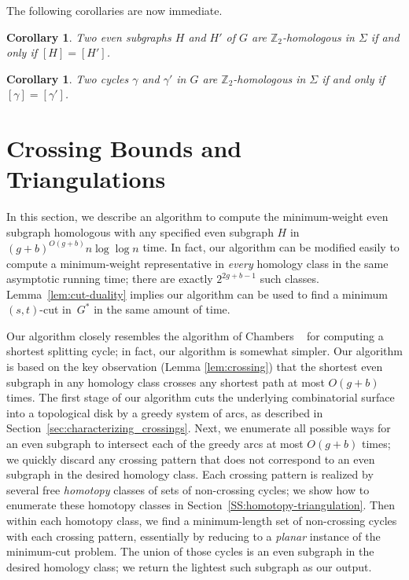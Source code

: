 \documentclass[11pt,twoside]{article}
\def\Z{\mathbb{Z}}
\def\cycle{\gamma}
\newtheorem{corollary}[theorem]{Corollary}
\begin{document}
The following corollaries are now immediate.

\begin{corollary}
Two even subgraphs $H$ and $H'$ of $G$ are $\Z_2$-homologous in $\Sigma$ if and only if $[H] = [H']$.
\end{corollary}

\begin{corollary}
Two cycles $\cycle$ and $\cycle'$ in $G$ are $\Z_2$-homologous in $\Sigma$ if and only if $[\cycle] = [\cycle']$.
\end{corollary}

\section{Crossing Bounds and Triangulations}
\label{sec:crossing}


In this section, we describe an
algorithm to compute the minimum-weight even subgraph homologous with any specified even subgraph 
$H$ in $(g+b)^{O(g+b)}n\log \log n$ time.  In fact, our algorithm can be
modified easily to compute a minimum-weight representative in
\emph{every} homology class in the same asymptotic running time;
there are exactly $2^{2g+b-1}$ such classes.
Lemma~\ref{lem:cut-duality} implies our algorithm can be used to find a minimum $(s,t)$-cut in~$G^*$ in the same amount of time.

Our algorithm closely resembles the algorithm of Chambers \etal~\cite{ccelw-scsih-08} for computing a shortest splitting cycle; in fact, our algorithm is somewhat simpler.  Our algorithm is based on the key observation (Lemma \ref{lem:crossing})  that the shortest even subgraph in any homology class crosses any shortest path at most $O(g+b)$ times.  The first stage of our algorithm cuts the underlying combinatorial surface into a topological disk by a greedy system of arcs, as described in Section~\ref{sec:characterizing_crossings}.  Next, we enumerate all possible ways for an even subgraph to intersect each of the greedy arcs at most $O(g+b)$ times; we quickly discard any crossing pattern that does not correspond to an even subgraph in the desired homology class.  Each crossing pattern is realized by several free \emph{homotopy} classes of sets of non-crossing cycles; we show how to enumerate these homotopy classes in Section~\ref{SS:homotopy-triangulation}.  Then within each homotopy class, we find a minimum-length set of non-crossing cycles with each crossing pattern, essentially by reducing to a \emph{planar} instance of the minimum-cut problem.  The union of those cycles is an even subgraph in the desired homology class; we return the lightest such subgraph as our output.
\end{document}
